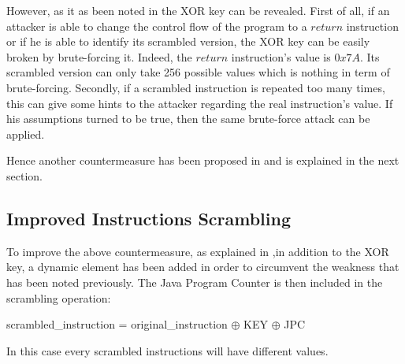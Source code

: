 However, as it as been noted in \cite{dynamicsyntax} the XOR key can be revealed. First of all, if
an attacker is able to change the control flow of the program to a $return$ instruction or if he is
able to identify its scrambled version, the XOR key can be easily broken by brute-forcing it.
Indeed, the $return$ instruction's value is $0x7A$. Its scrambled version can only take 256 possible
values which is nothing in term of brute-forcing.  
Secondly, if a scrambled instruction is repeated too many times, this can give some hints to the
attacker regarding the real instruction's value. If his assumptions turned to be true, then the same
brute-force attack can be applied.

Hence another countermeasure has been proposed in \cite{dynamicsyntax} and is explained in the next section.

\subsection{Improved Instructions Scrambling}

To improve the above countermeasure, as explained in \cite{dynamicsyntax},in addition to the XOR
key, a dynamic element has been added in order to circumvent the weakness that has been noted
previously. The Java Program Counter is then included in the scrambling operation:
 
 \begin{center}
scrambled\_instruction = original\_instruction $\oplus$ KEY $\oplus$ JPC
\end{center}

In this case every scrambled instructions will have different values.

